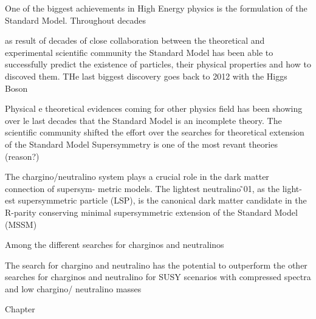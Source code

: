 


One of the biggest achievements in High Energy physics is the formulation of the Standard Model. Throughout decades 

 as result of decades of close collaboration between the theoretical and experimental scientific community the Standard Model has been able to successfully predict the existence of particles, their physical properties and how to discoved them. THe last biggest discovery goes back to 2012 with the Higgs Boson
 
 Physical e theoretical evidences coming for other physics field has been showing over le last decades that the Standard Model is an incomplete theory. 
 The scientific community shifted the effort over the searches for theoretical extension of the Standard Model
 Supersymmetry is one of the most revant theories (reason?)
 
 The chargino/neutralino system plays a crucial role in the dark matter connection of supersym- metric models. The lightest neutralino   ̃01, as the light- est supersymmetric particle (LSP), is the canonical dark matter candidate in the R-parity conserving minimal supersymmetric extension of the Standard Model (MSSM)
 
 Among the different searches for charginos and neutralinos
 
The search for chargino and neutralino has the potential to outperform the other searches for charginos and neutralino for SUSY scenarios with compressed spectra and low chargino/ neutralino masses

Chapter 



